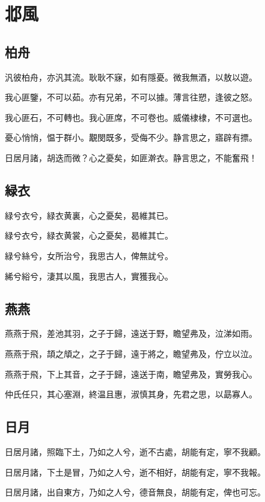 \section[邶風]{邶風}

\subsection[柏舟]{柏舟}

汎彼柏舟，亦汎其流。耿耿不寐，如有隱憂。微我無酒，以敖以遊。

我心匪鑒，不可以茹。亦有兄弟，不可以據。薄言往愬，逢彼之怒。

我心匪石，不可轉也。我心匪席，不可卷也。威儀棣棣，不可選也。

憂心悄悄，愠于群小。覯閔既多，受侮不少。静言思之，寤辟有摽。

日居月諸，胡迭而微？心之憂矣，如匪澣衣。静言思之，不能奮飛！

\subsection[緑衣]{緑衣}

緑兮衣兮，緑衣黄裏，心之憂矣，曷維其已。

緑兮衣兮，緑衣黄裳，心之憂矣，曷維其亡。

緑兮絲兮，女所治兮，我思古人，俾無訧兮。

絺兮綌兮，淒其以風，我思古人，實獲我心。

\subsection[燕燕]{燕燕}

燕燕于飛，差池其羽，之子于歸，遠送于野，瞻望弗及，泣涕如雨。

燕燕于飛，頡之頏之，之子于歸，遠于將之，瞻望弗及，佇立以泣。

燕燕于飛，下上其音，之子于歸，遠送于南，瞻望弗及，實勞我心。

仲氏任只，其心塞淵，終温且惠，淑慎其身，先君之思，以勗寡人。

\subsection[日月]{日月}

日居月諸，照臨下土，乃如之人兮，逝不古處，胡能有定，寧不我顧。

日居月諸，下土是冒，乃如之人兮，逝不相好，胡能有定，寧不我報。

日居月諸，出自東方，乃如之人兮，德音無良，胡能有定，俾也可忘。

